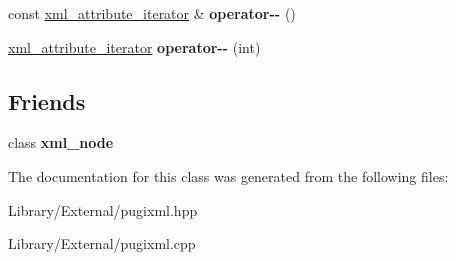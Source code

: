 \begin{DoxyCompactItemize}
\item 
\hypertarget{classpugi_1_1xml__attribute__iterator_a7ac06eb61d47a9e57bcd0fd2434c6243}{}const \hyperlink{classpugi_1_1xml__attribute__iterator}{xml\+\_\+attribute\+\_\+iterator} \& {\bfseries operator-\/-\/} ()\label{classpugi_1_1xml__attribute__iterator_a7ac06eb61d47a9e57bcd0fd2434c6243}

\item 
\hypertarget{classpugi_1_1xml__attribute__iterator_a48737f6e77abe7fa3e80841597dc93e1}{}\hyperlink{classpugi_1_1xml__attribute__iterator}{xml\+\_\+attribute\+\_\+iterator} {\bfseries operator-\/-\/} (int)\label{classpugi_1_1xml__attribute__iterator_a48737f6e77abe7fa3e80841597dc93e1}

\end{DoxyCompactItemize}
\subsection*{Friends}
\begin{DoxyCompactItemize}
\item 
\hypertarget{classpugi_1_1xml__attribute__iterator_a156d917a92815c7b593bd5ef19f6d5fb}{}class {\bfseries xml\+\_\+node}\label{classpugi_1_1xml__attribute__iterator_a156d917a92815c7b593bd5ef19f6d5fb}

\end{DoxyCompactItemize}


The documentation for this class was generated from the following files\+:\begin{DoxyCompactItemize}
\item 
Library/\+External/pugixml.\+hpp\item 
Library/\+External/pugixml.\+cpp\end{DoxyCompactItemize}
